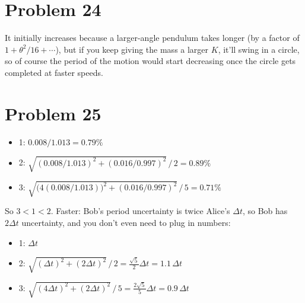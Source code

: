 \documentclass[11pt]{article}
\begin{document}
\section*{Problem 24}
It initially increases because a larger-angle pendulum takes longer (by a factor of $1+\theta^2/16+\cdots$), but if you keep giving the mass a larger $K$, it'll swing in a circle, so of course the period of the motion would start decreasing once the circle gets completed at faster speeds.

\section*{Problem 25}
\begin{itemize}[leftmargin=*, itemsep=0.25em]
\item 1: $0.008/1.013=0.79\%$
\item 2: $\sqrt{(0.008/1.013)^2+(0.016/0.997)^2}\,/\,2=0.89\%$
\item 3: $\sqrt{\big(4(0.008/1.013)\big)^2+(0.016/0.997)^2}\,/\,5=0.71\%$
\end{itemize}
So $3<1<2$. Faster: Bob's period uncertainty is twice Alice's $\Delta t$, so Bob has $2\Delta t$ uncertainty, and you don't even need to plug in numbers:
\begin{itemize}[leftmargin=*, itemsep=0.25em]
\item 1: $\Delta t$
\item 2: $\sqrt{(\Delta t)^2+(2\Delta t)^2}\,/\,2=\frac{\sqrt5}{2}\Delta t=1.1\,\Delta t$
\item 3: $\sqrt{(4\Delta t)^2+(2\Delta t)^2}\,/\,5=\frac{2\sqrt5}{5}\Delta t=0.9\,\Delta t$
\end{itemize}
\end{document}
